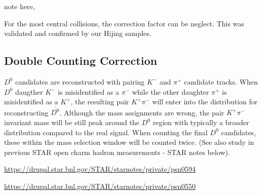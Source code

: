 note here,

For the most central collisions, the correction factor can be neglect. This was validated and confirmed by our Hijing samples.
\subsection{Double Counting Correction} 





$D^0$ candidates are reconstructed with pairing $K^-$ and $\pi^+$ candidate tracks. When $D^0$ daugther $K^-$ is misidentified as a $\pi^-$ while the other daughter $\pi^+$ is misidentified as a $K^+$, the resulting pair $K^+\pi^-$ will enter into the distribution for reconstructing $\overline{D^0}$. Although the mass assignments are wrong, the pair $K^+\pi^-$ invariant mass will be still peak around the $D^0$ region with typically a broader distribution compared to the real signal. When counting the final $D^0$ candidates, these within the mass selection window will be counted twice. (See also study in previous STAR open charm hadron measurements - STAR notes below).

\url{https://drupal.star.bnl.gov/STAR/starnotes/private/psn0594}

\url{https://drupal.star.bnl.gov/STAR/starnotes/private/psn0550}

